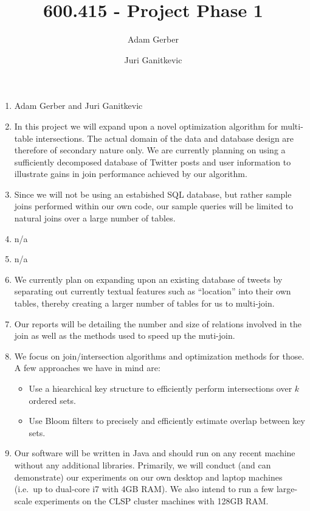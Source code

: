 \documentclass[letterpaper,graphics,11pt]{article}
\title{600.415 - Project Phase 1}
\author{Adam Gerber \and Juri Ganitkevic}
\begin{document}
\maketitle


\section*{}

\begin{enumerate}[(1)]

\item Adam Gerber and Juri Ganitkevic

\item In this project we will expand upon a novel optimization
  algorithm for multi-table intersections. The actual domain of the
  data and database design are therefore of secondary nature only. We
  are currently planning on using a sufficiently decomposed database
  of Twitter posts and user information to illustrate gains in join
  performance achieved by our algorithm.

\item Since we will not be using an estabished SQL database, but
  rather sample joins performed within our own code, our sample queries
  will be limited to natural joins over a large number of tables.

\item n/a

\item n/a

\item We currently plan on expanding upon an existing database of
  tweets by separating out currently textual features such as
  ``location'' into their own tables, thereby creating a larger number
  of tables for us to multi-join.
   
\item Our reports will be detailing the number and size of
  relations involved in the join as well as the methods used to speed
  up the muti-join.

\item We focus on join/intersection algorithms and optimization
  methods for those. A few approaches we have in mind are:
  \begin{itemize}
  \item Use a hiearchical key structure to efficiently perform
    intersections over $k$ ordered sets.
  \item Use Bloom filters to precisely and efficiently estimate
    overlap between key sets.
  \end{itemize}

\item Our software will be written in Java and should run on any
  recent machine without any additional libraries. Primarily, we will
  conduct (and can demonstrate) our experiments on our own desktop and
  laptop machines (i.e.\ up to dual-core i7 with 4GB RAM). We also
  intend to run a few large-scale experiments on the CLSP cluster
  machines with 128GB RAM.

\end{enumerate}

\end{document}
